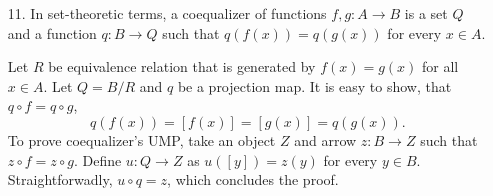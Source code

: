 \documentclass[12pt]{article}
\theoremstyle{definition}
\begin{document}
\begin{enumerate}
    \newtheorem*{noninjective-poset}{Example of non-injective poset}
    \begin{noninjective-poset}
      
    \end{noninjective-poset}

  \item[11.]
    In set-theoretic terms, a coequalizer of functions $f, g : A \to B$ is a set $Q$ and a function $q : B \to Q$ such that $q(f(x)) = q(g(x))$ for every $x \in A$.
    \begin{figure}[H]
      \centering
    \end{figure}
    Let $R$ be equivalence relation that is generated by $f(x) = g(x)$ for all $x \in A$. Let $Q = B/R$ and $q$ be a projection map. It is easy to show, that $q \circ f = q \circ g$, $$q(f(x)) = [f(x)] = [g(x)] = q(g(x)).$$ To prove coequalizer's UMP, take an object $Z$ and arrow $z : B \to Z$ such that $z \circ f = z \circ g$. Define $u : Q \to Z$ as $u([y]) = z(y)$ for every $y \in B$. Straightforwadly, $u \circ q = z$, which concludes the proof.
\end{enumerate}
\end{document}
